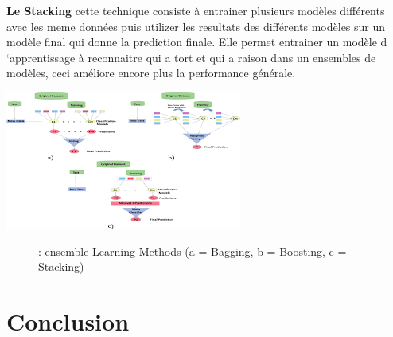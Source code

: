 \documentclass[french,a4paper,12pt]{article}
\begin{document}
\textbf{Le Stacking}
\quad cette technique consiste à entrainer plusieurs modèles différents avec les meme données puis utilizer les resultats des différents modèles  sur un modèle final qui donne la prediction finale. Elle permet entrainer un modèle d ‘apprentissage à reconnaitre qui a tort et qui a raison dans un ensembles de modèles, ceci améliore encore plus la performance générale. 


 \begin{center}
\includegraphics[scale=1]{Techniques ensembles learning.png}
\begin{figure}[h]
\caption{: ensemble Learning Methods (a = Bagging, b = Boosting, c = Stacking)}
\end{figure}
\end{center}
























\newpage
\section{Conclusion}






\newpage
\begin{center}
\listoffigures
\end{center}

\newpage

\begin{center}


\end{center}
\end{document}
